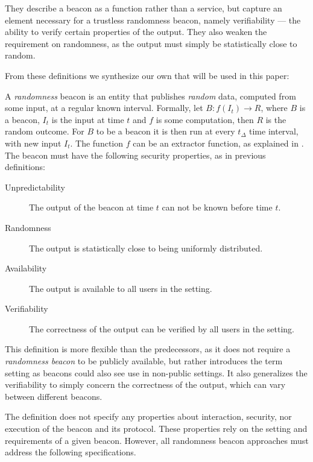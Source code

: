 They describe a beacon as a function rather than a service, but capture an element necessary for a trustless randomness beacon, namely verifiability --- the ability to verify certain properties of the output. They also weaken the requirement on randomness, as the output must simply be statistically close to random. 

From these definitions we synthesize our own that will be used in this paper: 

A \emph{randomness} beacon is an entity that publishes \emph{random} data, computed from some input, at a regular known interval.
Formally, let $B: f(I_t) \rightarrow R$, where $B$ is a beacon, $I_t$ is the input at time $t$ and $f$ is some computation, then $R$ is the random outcome.
For $B$ to be a beacon it is then run at every $t_\Delta$ time interval, with new input $I_t$.
The function $f$ can be an extractor function, %
as explained in .
The beacon must have the following security properties, as in previous definitions: 

\begin{description}
    \item[Unpredictability] The output of the beacon at time $t$ can not be known before time $t$. 
    \item[Randomness] The output is statistically close to being uniformly distributed. 
    \item[Availability] The output is available to all users in the setting. 
    \item[Verifiability] The correctness of the output can be verified by all users in the setting.  
\end{description}

This definition is more flexible than the predecessors, as it does not require a \emph{randomness beacon} to be publicly available, but rather introduces the term setting as beacons could also see use in non-public settings. It also generalizes the verifiability to simply concern the correctness of the output, which can vary between different beacons. 

The definition does not specify any properties about interaction, security, nor execution of the beacon and its protocol.
These properties rely on the setting and requirements of a given beacon.
However, all randomness beacon approaches must address the following specifications.
